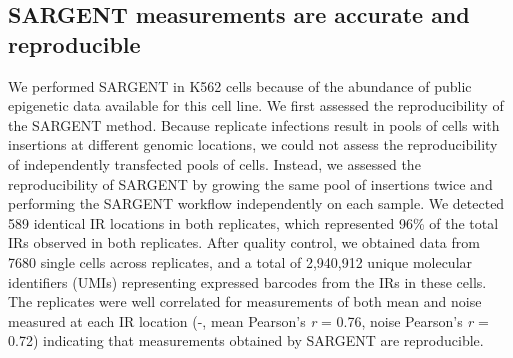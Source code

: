 \subsection{SARGENT measurements are accurate and reproducible}

We performed SARGENT in K562 cells because of the abundance of public epigenetic data available for this cell line. We first assessed the reproducibility of the SARGENT method. Because replicate infections result in pools of cells with insertions at different genomic locations, we could not assess the reproducibility of independently transfected pools of cells. Instead, we assessed the reproducibility of SARGENT by growing the same pool of insertions twice and performing the SARGENT workflow independently on each sample. We detected 589 identical IR locations in both replicates, which represented 96\% of the total IRs observed in both replicates. After quality control, we obtained data from 7680 single cells across replicates, and a total of 2,940,912 unique molecular identifiers (UMIs) representing expressed barcodes from the IRs in these cells. The replicates were well correlated for measurements of both mean and noise measured at each IR location (-, mean Pearson’s \textit{r} = 0.76, noise Pearson’s \textit{r} = 0.72) indicating that measurements obtained by SARGENT are reproducible.

